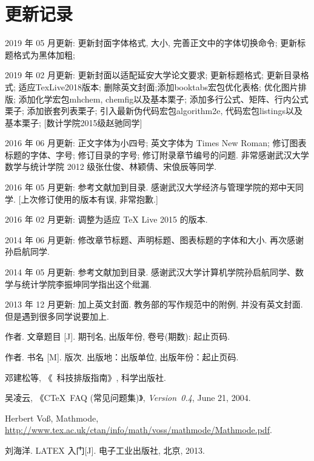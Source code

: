 \documentclass[forprint]{YAUthesis}
\begin{document}
\chapter{更新记录}
2019 年 05 月更新: 更新封面字体格式, 大小, 完善正文中的字体切换命令; 更新标题格式为黑体加粗; 

2019 年 02 月更新: 更新封面以适配延安大学论文要求; 更新标题格式; 更新目录格式; 
适应TexLive2018版本; 删除英文封面;添加booktabs宏包优化表格; 优化图片排版; 
添加化学宏包mhchem, chemfig以及基本栗子; 
添加多行公式、矩阵、行内公式栗子; 添加嵌套列表栗子; 
引入最新伪代码宏包algorithm2e, 代码宏包listings以及基本栗子;
[数计学院2015级赵驰同学]

2016 年 06 月更新: 正文字体为小四号; 英文字体为 Times New Roman; 修订图表标题的字体、字号; 修订目录的字号; 修订附录章节编号的问题. 
                          非常感谢武汉大学数学与统计学院 2012 级张仕俊、林颖倩、宋俍辰等同学. 

2016 年 05 月更新: 参考文献加到目录. 感谢武汉大学经济与管理学院的郑中天同学. [上次修订使用的版本有误, 非常抱歉.]

2016 年 02 月更新: 调整为适应 TeX Live 2015 的版本.

2014 年 06 月更新: 修改章节标题、声明标题、图表标题的字体和大小. 再次感谢孙启航同学.

2014 年 05 月更新: 参考文献加到目录. 感谢武汉大学计算机学院孙启航同学、数学与统计学院李振坤同学指出这个纰漏.

2013 年 12 月更新: 加上英文封面. 教务部的写作规范中的附例, 并没有英文封面. 但是遇到很多同学说要加上.





\cleardoublepage{}
{}
\begin{thebibliography}{00}

   作者. 文章题目 [J].  期刊名, 出版年份, 卷号(期数): 起止页码.

   作者. 书名 [M]. 版次. 出版地：出版单位, 出版年份：起止页码.

   邓建松等, 《\LaTeXe~科技排版指南》, 科学出版社.

   吴凌云, 《CTeX~FAQ (常见问题集)》, \textit{Version~0.4}, June 21, 2004.

   Herbert Vo\ss, Mathmode, \url{http://www.tex.ac.uk/ctan/info/math/voss/mathmode/Mathmode.pdf}.
  
   刘海洋. LATEX 入门[J]. 电子工业出版社, 北京, 2013.

\end{thebibliography}
\end{document}
